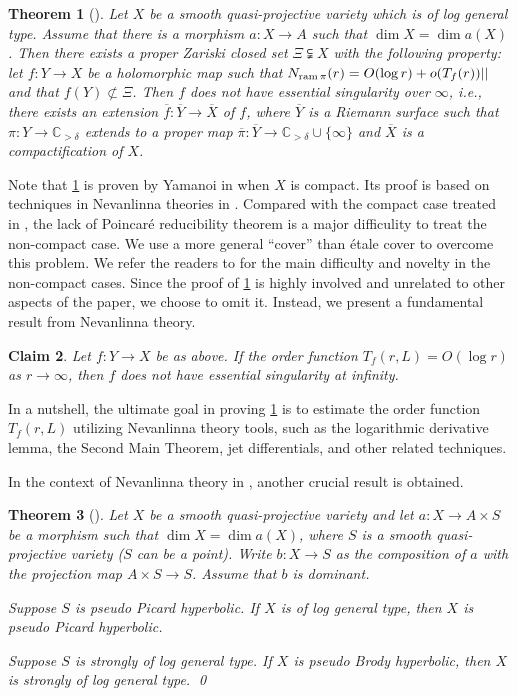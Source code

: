 \documentclass[english]{amsproc}
\theoremstyle{plain}
\newtheorem{thm}{Theorem}[section]
\newtheorem{claim}[thm]{Claim}
\theoremstyle{definition}
\theoremstyle{remark}
\theoremstyle{plain}
\numberwithin{equation}{thm} %
\newcommand{\ram}{{\rm ram}\,}
\begin{document}
	\begin{thm}[{\cite[Theorem A]{CDY25}}]\label{thm2nd}
		Let $X$ be a smooth quasi-projective variety which is of log general type.
		Assume that there is a morphism $a:X\to A$ such that $\dim X=\dim a(X)$.
		Then there exists a proper Zariski closed set $\Xi\subsetneqq X$ with the following property:
		let $f:Y\to X$ be a holomorphic map such that $N_{\ram\pi}(r)=O(\log r)+o(T_f(r))||$ and that $f(Y)\not\subset \Xi$.
		Then $f$ does not have essential singularity over $\infty$, i.e.,	there exists an extension $\overline{f}:\overline{Y}\to\overline{X}$ of $f$, where $\overline{Y}$ is a Riemann surface such that  $\pi:Y\to \mathbb C_{>\delta}$ extends to a proper map $\overline{\pi}:\overline{Y}\to \mathbb C_{>\delta}\cup\{\infty\}$  
		and $\overline{X}$ is a compactification of $X$.	
	\end{thm}
	Note that \cref{thm2nd} is proven by Yamanoi in \cite{Yam15} when $X$ is compact. Its proof  is based on techniques in Nevanlinna theories  in \cite{Yam15}.  Compared with the compact case treated in \cite{Yam15}, the lack of Poincar{\'e} reducibility theorem is a major difficulity to treat the non-compact case.
	We use a more general ``cover'' than {\'e}tale cover to overcome this problem.   We refer the readers to \cite[Remark 10.11]{CDY25} for the main difficulty and novelty in the non-compact cases.  Since the proof of \cref{thm2nd} is highly involved and unrelated to other aspects of the paper, we choose to omit it. Instead, we present a fundamental result from Nevanlinna theory.
	\begin{claim}
		Let $f:Y\to X$ be as above. If the order function $T_f(r,L)=O(\log r)$ as $r\to\infty$, then $f$ does not have essential singularity at infinity. 
	\end{claim}
	In a nutshell, the ultimate goal in proving  \cref{thm2nd} is to estimate  the order  function $T_f(r,L)$ utilizing Nevanlinna theory tools, such as the logarithmic derivative lemma, the Second Main Theorem, jet differentials, and other related techniques.
	
	
	
	In the context of Nevanlinna theory in \cite[\S 10]{CDY25}, another crucial result is obtained.
	\begin{thm}[{\cite[Corollary 10.8]{CDY25}}]\label{cor:GGL}
		Let $X$ be a smooth quasi-projective variety and let $a:X\to A\times S$ be a morphism such that $\dim X=\dim a(X)$, where $S$ is a smooth quasi-projective variety ($S$ can be a point). Write $b:X\to S$ as the composition of $a$ with the projection map $A\times S\to S$. Assume that $b$ is dominant.
		\begin{thmlist}
			\item\label{coritem1} 
			Suppose $S$ is pseudo Picard hyperbolic.
			If $X$ is of log general type, then $X$  is pseudo Picard hyperbolic.
			\item \label{coritem2} Suppose $S$ is strongly of log general type. 
			If $X$ is pseudo Brody hyperbolic, then $X$ is strongly of log general type.   \qed
		\end{thmlist} 
	\end{thm} 
	
\end{document}
